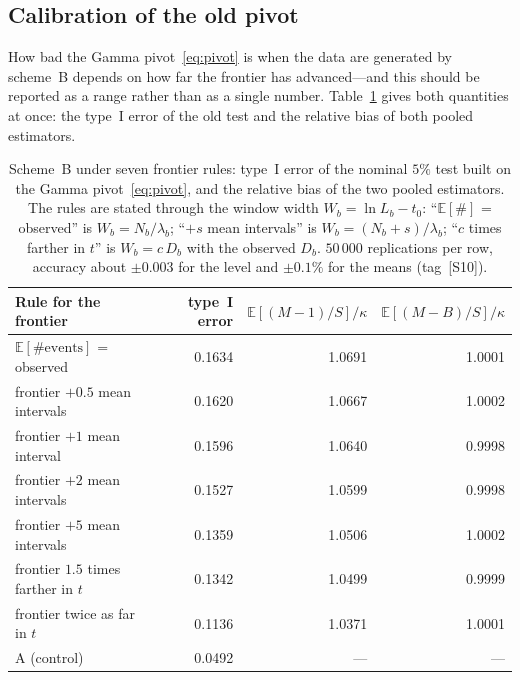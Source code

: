 \documentclass[11pt,a4paper]{article}
\theoremstyle{plain}
\theoremstyle{remark}
\begin{document}
\subsection{Calibration of the old pivot}\label{sec:calib}

How bad the Gamma pivot~\eqref{eq:pivot} is when the data are generated by
scheme~B depends on how far the frontier has advanced---and this should be
reported as a range rather than as a single number. Table~\ref{tab:calib} gives
both quantities at once: the type~I error of the old test and the relative bias
of both pooled estimators.

\begin{table}[t]
\centering
\caption{Scheme~B under seven frontier rules: type~I error of the nominal $5\%$
test built on the Gamma pivot~\eqref{eq:pivot}, and the relative bias of the two
pooled estimators. The rules are stated through the window width
$W_b=\ln L_b-t_0$: ``$\mathbb E[\#]$ = observed'' is $W_b=N_b/\lambda_b$;
``$+s$ mean intervals'' is $W_b=(N_b+s)/\lambda_b$; ``$c$ times farther in $t$''
is $W_b=c\,D_b$ with the observed $D_b$. $50\,000$ replications per row, accuracy
about $\pm0.003$ for the level and $\pm0.1\%$ for the means (tag~[S10]).}
\label{tab:calib}
\small
\begin{tabular}{lrrr}
\toprule
Rule for the frontier & type~I error & $\mathbb E[(M{-}1)/S]/\kappa$
& $\mathbb E[(M{-}B)/S]/\kappa$\\
\midrule
$\mathbb E[\#\text{events}]$ = observed & 0.1634 & 1.0691 & 1.0001\\
frontier $+0.5$ mean intervals & 0.1620 & 1.0667 & 1.0002\\
frontier $+1$ mean interval & 0.1596 & 1.0640 & 0.9998\\
frontier $+2$ mean intervals & 0.1527 & 1.0599 & 0.9998\\
frontier $+5$ mean intervals & 0.1359 & 1.0506 & 1.0002\\
frontier $1.5$ times farther in $t$ & 0.1342 & 1.0499 & 0.9999\\
frontier twice as far in $t$ & 0.1136 & 1.0371 & 1.0001\\
\midrule
A (control) & 0.0492 & --- & ---\\
\bottomrule
\end{tabular}
\end{table}
\end{document}
